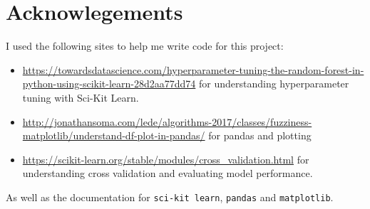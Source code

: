 \documentclass{article}
\begin{document}
\section*{Acknowlegements}
I used the following sites to help me write code for this project:
\begin{itemize}
\item \url{https://towardsdatascience.com/hyperparameter-tuning-the-random-forest-in-python-using-scikit-learn-28d2aa77dd74} for understanding hyperparameter tuning with Sci-Kit Learn.
\item \url{http://jonathansoma.com/lede/algorithms-2017/classes/fuzziness-matplotlib/understand-df-plot-in-pandas/} for pandas and plotting
\item \url{https://scikit-learn.org/stable/modules/cross_validation.html} for understanding cross validation and evaluating model performance.
\end{itemize}
As well as the documentation for \texttt{sci-kit learn}, \texttt{pandas} and \texttt{matplotlib}.
\end{document}
